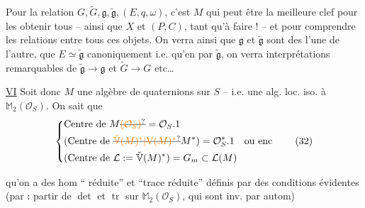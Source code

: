 Pour la relation    $G,\widetilde G,\mathfrak g,\widetilde{\mathfrak g},(E,q,\omega)$, c'est $M$ qui  peut être la meilleure clef pour les obtenir tous -- ainsi que $X$ et $(P,C)$, tant qu'à faire ! -- et pour comprendre les relations entre tous ces objets. On verra ainsi que $\mathfrak g$ et $\widetilde{\mathfrak g}$ sont des  l'une de l'autre, que $E\simeq\widetilde{\mathfrak g}$ canoniquement i.e. qu'en %
par $\widetilde{\mathfrak g}$, on verra  interprétations remarquables de $\widetilde{\mathfrak g}\to\mathfrak g$ et $\widetilde G\to G$ etc\ldots

\uline{VI} Soit donc $M$ une algèbre de quaternions sur $S$ -- i.e. une alg. loc.  iso. à  $\mathbb M_2(\mathcal O_S)$. On sait que
\[
\left\{\begin{aligned}
&\text{Centre de }M\deleted{\unsure{(\mathcal O_S)}}=\mathcal O_S.1\\
&(\text{Centre de }\deleted{\unsure{\check{\mathbb V}(M)^*|\mathrm V(M)^*}}M^*)=\mathcal O_S^*.1\quad\text{ou enc}\\
&(\text{Centre de }\mathcal L:=\check{\mathbb V}(M)^*)=G_m\subset\mathcal L(M)
\end{aligned}\right. \tag*{(32)}
\]

 qu'on a des hom `` réduite'' et ``trace réduite''
définis par des conditions évidentes (par   : partir de $\det$ et $\operatorname{tr}$ sur $\mathbb M_2(\mathcal O_S)$,  qui sont inv. par autom)

